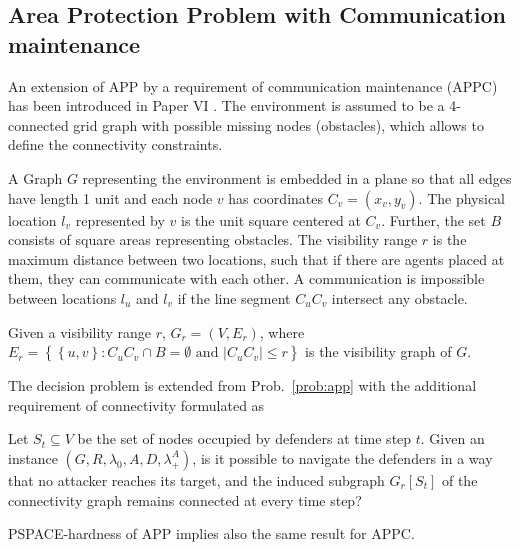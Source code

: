 \subsection{Area Protection Problem with Communication maintenance}

An extension of APP by a requirement of communication maintenance (APPC) has been introduced in Paper VI \cite{ivanova18b}.
The environment is assumed to be a 4-connected grid graph with possible missing nodes (obstacles), which allows to define the connectivity constraints.

A Graph $G$ representing the environment is embedded in a plane so that all edges have length 1 unit and each node $v$ has coordinates $C_v=(x_v,y_v)$.
The physical location $l_v$ represented by $v$ is the unit square centered at $C_v$.
Further, the set $B$ consists of square areas representing obstacles.
The visibility range $r$ is the maximum distance between two locations, such that if there are agents placed at them, they can communicate with each other.
A communication is impossible between locations $l_u$ and $l_v$ if the line segment $C_uC_v$ intersect any obstacle. 
\begin{definition}
	Given a visibility range $r$, $G_r=(V,E_r)$, where \newline
	$E_r=\left\{\left\{u,v\right\}:C_uC_v\cap B=\emptyset\text{ and } |C_uC_v|\leq r\right\}$ is the visibility graph of $G$.
\end{definition}

The decision problem is extended from Prob.~\ref{prob:app} with the additional requirement of connectivity formulated as
\begin{problem}
	Let $S_t\subseteq V$ be the set of nodes occupied by defenders at time step $t$.
	Given an instance $(G,R,\lambda_0,A, D, \lambda_+^A)$, is it possible to navigate the defenders in a way that no attacker reaches its target,
	and the induced subgraph $G_r\left[S_t\right]$ of the connectivity graph remains connected at every time step?
\end{problem}
PSPACE-hardness of APP implies also the same result for APPC.

